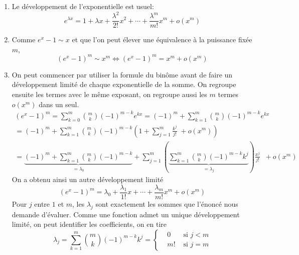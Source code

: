 \begin{enumerate}
 \item Le développement de l'exponentielle est usuel:
\begin{displaymath}
 e^{\lambda x} = 1 + \lambda x + \frac{\lambda^2}{2!}x^2 + \cdots +\frac{\lambda^m}{m!}x^m +o(x^m) 
\end{displaymath}

 \item Comme $e^x - 1 \sim x$ et que l'on peut élever une équivalence à la puissance fixée $m$,
\begin{displaymath}
 (e^x - 1)^m \sim x^m \Leftrightarrow (e^x - 1)^m = x^m + o(x^m)
\end{displaymath}
 
 \item On peut commencer par utiliser la formule du binôme avant de faire un développement limité de chaque exponentielle de la somme. On regroupe ensuite les termes avec le même exposant, on regroupe aussi les $m$ termes $o(x^m)$ dans un seul.
\begin{multline*}
 (e^x-1)^m
= \sum_{k=0}^{m}\binom{m}{k}(-1)^{m-k}e^{kx}
= (-1)^m + \sum_{k=1}^{m}\binom{m}{k}(-1)^{m-k}e^{kx}\\
= (-1)^m + \sum_{k=1}^{m}\binom{m}{k}(-1)^{m-k}\left(1+\sum_{j=1}^m \frac{k^j}{j!} \; + o(x^m)\right) \\
= \underset{=\lambda_0}{\underbrace{(-1)^m + \sum_{k=1}^{m}\binom{m}{k}(-1)^{m-k}}}
+\sum_{j=1}^m \left( 
\underset{=\lambda_j}{\underbrace{\sum_{k=1}^{m}\binom{m}{k}(-1)^{m-k} k^j}}
\right)\frac{x^j}{j!}\;\;+o(x^m) 
\end{multline*}
On a obtenu ainsi un autre développement limité
\begin{displaymath}
 (e^x - 1)^m = \lambda_0 + \frac{\lambda_1}{1!}x + \cdots + \frac{\lambda_m}{m!}x^m + o(x^m)
\end{displaymath}
Pour $j$ entre $1$ et $m$, les $\lambda_j$ sont exactement les sommes que l'énoncé nous demande d'évaluer. Comme une fonction admet un unique développement limité, on peut identifier les coefficients, on en tire
\begin{displaymath}
 \lambda_j = \sum_{k=1}^{m}\binom{m}{k}(-1)^{m-k} k^j =
\left\lbrace 
\begin{aligned}
 &0  &\text{ si } j<m \\
 &m! &\text{ si } j=m
\end{aligned}
\right. 
\end{displaymath}
\end{enumerate}
